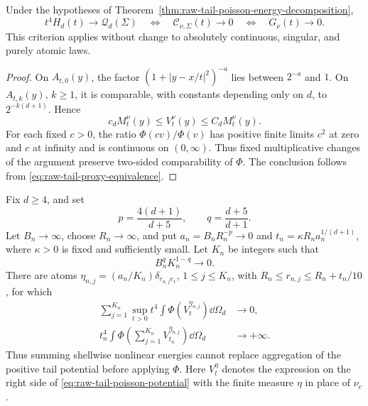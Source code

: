 \begin{corollary}
\label{cor:moving-annulus-tail-criterion}
Under the hypotheses of
Theorem~\ref{thm:raw-tail-poisson-energy-decomposition},
\[
 t^4H_d(t)\longrightarrow\mathcal Q_d(\Sigma)
 \quad\Longleftrightarrow\quad
 \mathcal C_{\nu,\Sigma}(t)\longrightarrow0
 \quad\Longleftrightarrow\quad
 G_\nu(t)\longrightarrow0.
\]
This criterion applies without change to absolutely continuous, singular,
and purely atomic laws.
\end{corollary}

\begin{proof}
On \(A_{t,0}(y)\), the factor
\((1+|y-x/t|^2)^{-a}\) lies between \(2^{-a}\) and \(1\).  On
\(A_{t,k}(y)\), \(k\ge1\), it is comparable, with constants depending only
on \(d\), to \(2^{-k(d+1)}\).  Hence
\[
 c_dM_t^\nu(y)\le V_t^\nu(y)\le C_dM_t^\nu(y).
\]
For each fixed \(c>0\), the ratio \(\Phi(cv)/\Phi(v)\) has positive finite
limits \(c^2\) at zero and \(c\) at infinity and is continuous on
\((0,\infty)\).  Thus fixed multiplicative changes of the argument preserve
two-sided comparability of \(\Phi\).  The conclusion follows from
\eqref{eq:raw-tail-proxy-equivalence}.
\end{proof}

\begin{proposition}
\label{prop:pre-phi-thin-shell-aggregation}
Fix \(d\ge4\), and set
\[
 p=\frac{4(d+1)}{d+5},\qquad q=\frac{d+5}{d+1}.
\]
Let \(B_n\to\infty\), choose \(R_n\to\infty\), and put
\(a_n=B_nR_n^{-p}\to0\) and
\(t_n=\kappa R_na_n^{1/(d+1)}\), where \(\kappa>0\) is fixed and
sufficiently small.  Let \(K_n\) be integers such that
\[
 B_n^qK_n^{1-q}\longrightarrow0.
\]
There are atoms \(\eta_{n,j}=(a_n/K_n)\delta_{r_{n,j}e_1}\),
\(1\le j\le K_n\), with
\(R_n\le r_{n,j}\le R_n+t_n/10\), for which
\begin{align}
 \sum_{j=1}^{K_n}\sup_{t>0}t^4
 \int\Phi(V_t^{\eta_{n,j}})\dd\Omega_d&\longrightarrow0,
 \label{eq:thin-shell-separated-energy}\\
 t_n^4\int\Phi\!\left(\sum_{j=1}^{K_n}
 V_{t_n}^{\eta_{n,j}}\right)\dd\Omega_d&\longrightarrow+\infty.
 \label{eq:thin-shell-aggregated-energy}
\end{align}
Thus summing shellwise nonlinear energies cannot replace aggregation of the
positive tail potential before applying \(\Phi\).
Here \(V_t^\eta\) denotes the expression on the right side of
\eqref{eq:raw-tail-poisson-potential} with the finite measure \(\eta\) in
place of \(\nu_c\).
\end{proposition}

